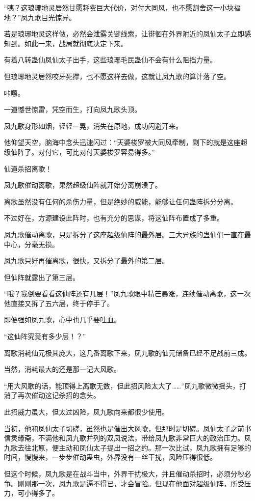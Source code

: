\begin{this_body}
“咦？这琅琊地灵居然甘愿耗费巨大代价，对付大同风，也不愿割舍这一小块福地？”凤九歌目光惊异。

若是琅琊地灵这样做，必然会泄露关键线索，让徘徊在外界附近的凤仙太子立即感知到。如此一来，战局就彻底决定下来。

有着八转蛊仙凤仙太子出手，这些琅琊毛民蛊仙不会有什么阻挡力量。

但琅琊地灵居然咬牙死撑，也不愿这样去做，这就让凤九歌的算计落了空。

咔嚓。

一道憾世惊雷，凭空而生，打向凤九歌头顶。

凤九歌身形如烟，轻轻一晃，消失在原地，成功闪避开来。

他仰望天空，脑海中念头迅速闪过：“天婆梭罗被大同风牵制，剩下的就是这座超级仙阵了。对付它，可比对付天婆梭罗容易得多。”

仙道杀招离歌！

凤九歌催动离歌，果然超级仙阵就开始分离崩溃了。

离歌虽然没有任何的杀伤力量，但是绝妙的威能，能够让任何蛊阵拆分分离。

不过好在，方源建设此阵时，也有充分的思谋，将这仙阵布置成了多重。

凤九歌催动离歌，只是拆分了这座超级仙阵的最外层。三大异族的蛊仙们一直在最中心，分毫无损。

凤九歌只好再催离歌，很快，又拆分了最外的第二层。

但仙阵就露出了第三层。

“哦？我倒要看看这仙阵还有几层！”凤九歌眼中精芒暴涨，连续催动离歌，这一次他直接又拆了五六层，终于停手了。

即便强如凤九歌，心中也几乎要吐血。

“这仙阵究竟有多少层！？”

离歌消耗仙元极其庞大，这几番离歌下来，凤九歌的仙元储备已经不足战前三成。

当然，消耗最大的还是那一记大风歌。

“用大风歌的话，能顶得上离歌无数，但此招风险太大了……”凤九歌微微摇头，打消了再次催动这记杀招的念头。

此招威力虽大，但太过凶险，凤九歌向来都很少使用。

当初，他和凤仙太子切磋，虽然也是催出大风歌，但那时是切磋。凤仙太子之前书信灵缘斋，不满他和凤九歌并列的双凤说法，带给凤九歌非常巨大的政治压力。凤九歌去往北原，便主动和凤仙太子提出一招之约。那一次比试，凤九歌拥有足够的时间，慢慢来，一步步催动蛊虫，外界没有一丝干扰，风险压得很低。

但这个时候，凤九歌是在战斗当中，外界干扰极大，并且催动杀招时，必须分秒必争。刚刚那一次，凤九歌是逼不得已，才会冒险。但现在他面对超级仙阵，所受压力，可小得多了。


\end{this_body}
